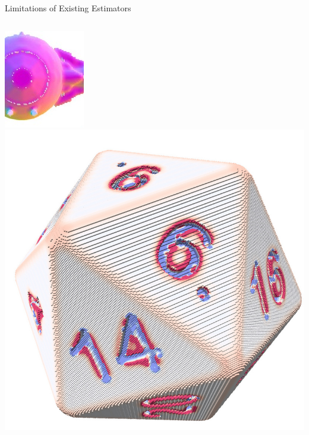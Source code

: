 \documentclass[11pt]{beamer}
\begin{document}
    \begin{frame}{Limitations of Existing Estimators}
        \centering
        \begin{columns}

            \includegraphics[width=0.85\linewidth]{pictures/tie256-IIN-flat-small-zoomed}
            \includegraphics[width=\linewidth]{pictures/d20-H-II-small}

\end{columns}
\end{frame}
\end{document}
